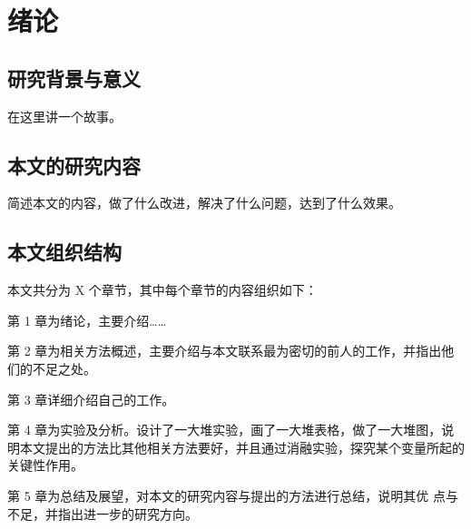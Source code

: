 \chapter{绪论}

\section{研究背景与意义}

在这里讲一个故事。

\section{本文的研究内容}

简述本文的内容，做了什么改进，解决了什么问题，达到了什么效果。

\section{本文组织结构}

本文共分为 X 个章节，其中每个章节的内容组织如下：

第 1 章为绪论，主要介绍……

第 2 章为相关方法概述，主要介绍与本文联系最为密切的前人的工作，并指出他们的不足之处。

第 3 章详细介绍自己的工作。

第 4 章为实验及分析。设计了一大堆实验，画了一大堆表格，做了一大堆图，说明本文提出的方法比其他相关方法要好，并且通过消融实验，探究某个变量所起的关键性作用。

第 5 章为总结及展望，对本文的研究内容与提出的方法进行总结，说明其优 点与不足，并指出进一步的研究方向。
